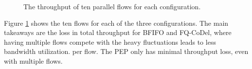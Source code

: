 \documentclass[a4paper,english, 12pt]{report}
\begin{document}
\begin{figure}[ht]
  \centering
  \hfill
  \hfill
  \caption{The throughput of ten parallel flows for each configuration.}
  \label{fig:completefig}
\end{figure}

Figure \ref{fig:completefig} shows the ten flows for each of the three configurations. The main takeaways are the loss in total throughput for BFIFO and FQ-CoDel, where having multiple flows compete with the heavy fluctuations leads to less bandwidth utilization. per flow. The PEP only has minimal throughput loss, even with multiple flows.\\
\end{document}
